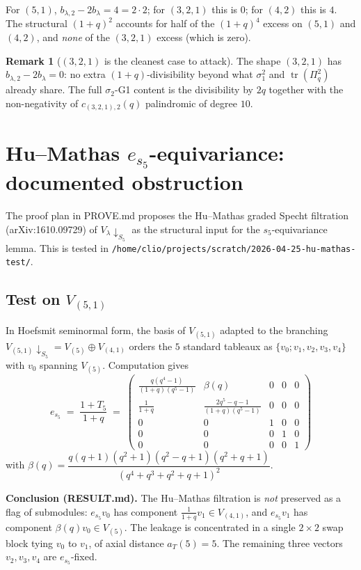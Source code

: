 \documentclass{article}
\theoremstyle{definition}
\newtheorem{remark}[theorem]{Remark}
\begin{document}
For $(5,1)$, $b_{\lambda,2}-2b_\lambda = 4 = 2\cdot 2$; for $(3,2,1)$ this is $0$;
for $(4,2)$ this is $4$. The structural $(1+q)^2$ accounts for half of the
$(1+q)^4$ excess on $(5,1)$ and $(4,2)$, and \emph{none} of the $(3,2,1)$ excess
(which is zero).

\begin{remark}[$(3,2,1)$ is the cleanest case to attack]
The shape $(3,2,1)$ has $b_{\lambda,2}-2b_\lambda = 0$: no extra
$(1+q)$-divisibility beyond what $\sigma_1^2$ and $\operatorname{tr}(\Pi_q^2)$
already share. The full $\sigma_2$-G1 content is the divisibility by $2q$
together with the non-negativity of $c_{(3,2,1),2}(q)$ palindromic of degree $10$.
\end{remark}

\section{Hu--Mathas $e_{s_5}$-equivariance: documented obstruction}

The proof plan in PROVE.md proposes the Hu--Mathas graded Specht filtration
(arXiv:1610.09729) of $V_\lambda \downarrow_{S_5}$ as the structural input
for the $s_5$-equivariance lemma. This is tested in
\verb|/home/clio/projects/scratch/2026-04-25-hu-mathas-test/|.

\subsection{Test on $V_{(5,1)}$}

In Hoefsmit seminormal form, the basis of $V_{(5,1)}$ adapted to the branching
$V_{(5,1)} \downarrow_{S_5} = V_{(5)} \oplus V_{(4,1)}$ orders the
$5$ standard tableaux as $\{v_0; v_1, v_2, v_3, v_4\}$ with $v_0$ spanning
$V_{(5)}$. Computation gives
\[
  e_{s_5} \;=\; \frac{1+T_5}{1+q}
  \;=\;
  \begin{pmatrix}
    \tfrac{q(q^4-1)}{(1+q)(q^5-1)} & \beta(q) & 0 & 0 & 0\\
    \tfrac{1}{1+q} & \tfrac{2q^5-q-1}{(1+q)(q^5-1)} & 0 & 0 & 0 \\
    0 & 0 & 1 & 0 & 0\\
    0 & 0 & 0 & 1 & 0\\
    0 & 0 & 0 & 0 & 1
  \end{pmatrix}
\]
with $\beta(q) = \dfrac{q(q+1)(q^2+1)(q^2-q+1)(q^2+q+1)}{(q^4+q^3+q^2+q+1)^2}$.

\textbf{Conclusion (RESULT.md).} The Hu--Mathas filtration is \emph{not}
preserved as a flag of submodules: $e_{s_5} v_0$ has component
$\frac{1}{1+q} v_1 \in V_{(4,1)}$, and $e_{s_5} v_1$ has component
$\beta(q) v_0 \in V_{(5)}$. The leakage is concentrated in a single $2\times 2$
swap block tying $v_0$ to $v_1$, of axial distance $a_T(5) = 5$. The remaining
three vectors $v_2, v_3, v_4$ are $e_{s_5}$-fixed.
\end{document}
